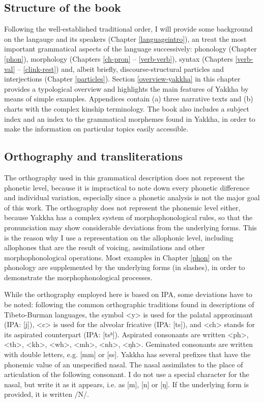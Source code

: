 \subsection{Structure of the book}


Following the well-established traditional order, I will provide some background on the langauge and its speakers (Chapter \ref{languageintro}), an treat the most important grammatical aspects of the language successively: phonology (Chapter \ref{phon}), morphology (Chapters \ref{ch-pron} – \ref{verb-verb}), syntax (Chapters \ref{verb-val} – \ref{clink-rest}) and, albeit briefly, discourse-structural particles and interjections (Chapter \ref{particles}). Section \ref{overview-yakkha} in this chapter provides a typological overview and highlights the main features of Yakkha by means of simple examples. Appendices contain (a) three narrative texts and  (b) charts with the complex kinship terminology. The book also includes  a subject index and an index to the grammatical morphemes found in Yakkha, in order to make the information on particular topics easily accessible. 


\subsection{Orthography and transliterations}\label{orth}

The orthography used in this grammatical description does not represent the phonetic level, because it is impractical to note down every phonetic difference and individual variation, especially since a phonetic analysis is not the major goal of this work. The orthography does not represent the phonemic level either, because Yakkha has a complex system of morphophonological rules, so that the pronunciation may show considerable deviations from the underlying forms. This is the reason why I use a representation on the allophonic level, including allophones that are the result of voicing, assimilations and other morphophonological operations. Most examples in Chapter \ref{phon} on the phonology  are supplemented by the underlying forms (in slashes), in order to demonstrate the morphophonological processes.

While the  orthography employed here is based on IPA, some deviations have to be noted: following the common orthographic traditions found in descriptions of Tibeto-Burman languages, the symbol <y> is used for the palatal approximant (IPA: [j]), <c> is used for the alveolar fricative (IPA: [ts]), and <ch> stands for its aspirated counterpart (IPA: [tsʰ]). Aspirated consonants are written <ph>, <th>, <kh>, <wh>, <mh>, <nh>, <ŋh>. Geminated consonants are written with double letters, e.g. [mm] or [ss]. Yakkha has several prefixes that have the phonemic value of an unspecified  nasal. The nasal assimilates to the place of articulation of the following consonant. I do not use a special character for the nasal, but write it as it appears, i.e. as [m], [n] or [ŋ]. If the underlying form is provided, it is written /N/. 

